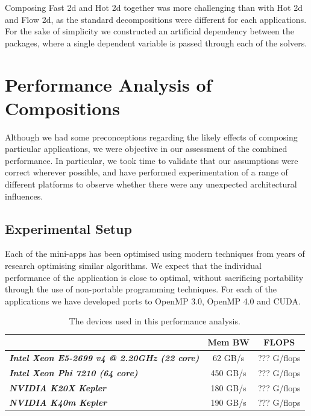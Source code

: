 \documentclass[runningheads,a4paper]{llncs}
\begin{document}
Composing Fast 2d and Hot 2d together was more challenging than with Hot 2d and Flow 2d, as the standard decompositions were different for each applications. For the sake of simplicity we constructed an artificial dependency between the packages, where a single dependent variable is passed through each of the solvers.

\section{Performance Analysis of Compositions}

Although we had some preconceptions regarding the likely effects of composing particular applications, we were objective in our assessment of the combined performance. In particular, we took time to validate that our assumptions were correct wherever possible, and have performed experimentation of a range of different platforms to observe whether there were any unexpected architectural influences.

\subsection{Experimental Setup}

Each of the mini-apps has been optimised using modern techniques from years of research optimising similar algorithms. We expect that the individual performance of the application is close to optimal, without sacrificing portability through the use of non-portable programming techniques. For each of the applications we have developed ports to OpenMP 3.0, OpenMP 4.0 and CUDA.

\begin{table}[h]
  \begin{center}
    \begin{tabular}{l|c|c}
      \hline
      \textbf{} & \textbf{Mem BW} & \textbf{FLOPS}  \\
      \hline
      \textit{\textbf{Intel Xeon E5-2699 v4 @ 2.20GHz (22 core)}} & 62 GB/s & ??? G/flops \\
      \textit{\textbf{Intel Xeon Phi 7210 (64 core)}} & 450 GB/s & ??? G/flops \\
      \textit{\textbf{NVIDIA K20X Kepler}} & 180 GB/s & ??? G/flops \\
      \textit{\textbf{NVIDIA K40m Kepler}} & 190 GB/s & ??? G/flops \\
    \end{tabular}
  \end{center}
  \caption{The devices used in this performance analysis.}
  \label{tab:hardware}
\end{table}
\end{document}
